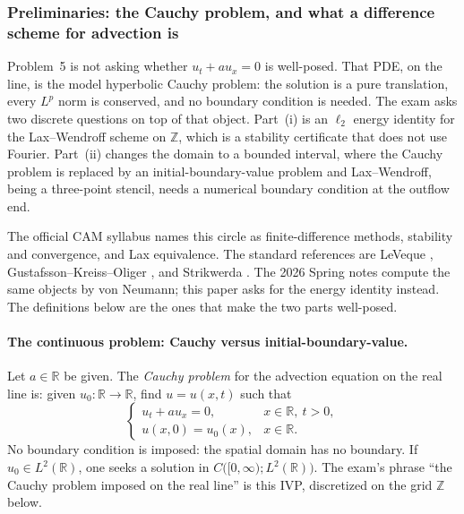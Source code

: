 \setcounter{section}{5}
\setcounter{theorem}{0}
\setcounter{definition}{0}
\setcounter{remark}{0}
\setcounter{note}{0}

\subsubsection{Preliminaries: the Cauchy problem, and what a difference scheme for advection is}

Problem~5 is not asking whether \(u_t+a u_x=0\) is well-posed. That PDE, on the line, is the model hyperbolic Cauchy problem: the solution is a pure translation, every \(L^p\) norm is conserved, and no boundary condition is needed. The exam asks two discrete questions on top of that object. Part~(i) is an \(\ell_2\) energy identity for the Lax--Wendroff scheme on \(\mathbb{Z}\), which is a stability certificate that does not use Fourier. Part~(ii) changes the domain to a bounded interval, where the Cauchy problem is replaced by an initial-boundary-value problem and Lax--Wendroff, being a three-point stencil, needs a numerical boundary condition at the outflow end.

The official CAM syllabus names this circle as finite-difference methods, stability and convergence, and Lax equivalence. The standard references are LeVeque \cite{leveque07}, Gustafsson--Kreiss--Oliger \cite{gko95}, and Strikwerda \cite{strikwerda04}. The 2026 Spring notes compute the same objects by von Neumann; this paper asks for the energy identity instead. The definitions below are the ones that make the two parts well-posed.

\paragraph{The continuous problem: Cauchy versus initial-boundary-value.}

\begin{definition}
\label{def:cauchy-adv}
Let \(a\in\mathbb{R}\) be given. The \emph{Cauchy problem} for the advection equation on the real line is: given \(u_0:\mathbb{R}\to\mathbb{R}\), find \(u=u(x,t)\) such that
\begin{equation}
\label{eq:cauchy-adv}
\begin{cases}
u_t + a u_x = 0, & x\in\mathbb{R},\ t>0, \\
u(x,0) = u_0(x), & x\in\mathbb{R}.
\end{cases}
\end{equation}
No boundary condition is imposed: the spatial domain has no boundary. If \(u_0\in L^2(\mathbb{R})\), one seeks a solution in \(C\bigl([0,\infty); L^2(\mathbb{R})\bigr)\). The exam's phrase ``the Cauchy problem imposed on the real line'' is this IVP, discretized on the grid \(\mathbb{Z}\) below.
\end{definition}


